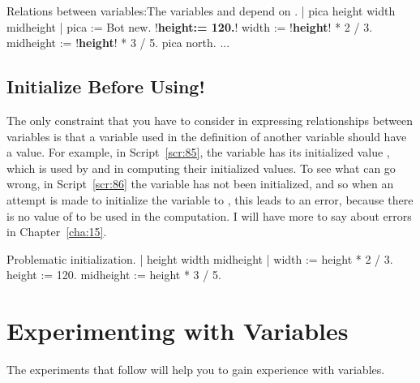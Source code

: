 \documentclass[a4paper,10pt,twoside]{book}
\begin{document}
\begin{script}[85]{Relations between variables:The variables  and  depend on .}
| pica height width midheight | 
pica := Bot new. 
!\textbf{height:= 120.}!
width := !\textbf{height}! * 2 / 3. 
midheight := !\textbf{height}! * 3 / 5. 
pica north. 
... 
\end{script}

\subsection{Initialize Before Using!} 

The only constraint that you have to consider in expressing relationships between variables is 
that a variable used in the definition of another variable should have a value. For example, in 
Script~\ref{scr:85}, the variable  has its initialized value , which is used by  and  in computing their initialized values. To see what can go wrong, in Script~\ref{scr:86} the variable  has not been initialized, and so when an attempt is made to initialize the variable  to ,   this leads to an error, because there is no   value of  to be used in the computation. I will have more to say about errors in Chapter~\ref{cha:15}.


\begin{script}[86]{Problematic  initialization.}
| height width midheight | 
width := height * 2 / 3. 
height := 120. 
midheight := height * 3 / 5.
\end{script}


\section{Experimenting with Variables}

The experiments that follow will help you to gain experience with variables. 
\end{document}
